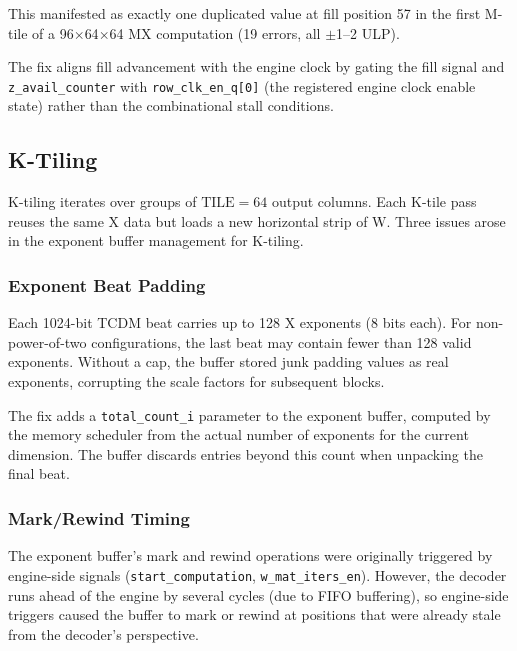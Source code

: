 This manifested as exactly one duplicated value at fill position 57 in the first
M-tile of a 96$\times$64$\times$64 MX computation (19 errors, all $\pm$1--2 ULP).

The fix aligns fill advancement with the engine clock by gating the fill signal
and \texttt{z\_avail\_counter} with \texttt{row\_clk\_en\_q[0]} (the registered
engine clock enable state) rather than the combinational stall conditions.



\subsection{K-Tiling}
\label{sec:k-tiling}

K-tiling iterates over groups of $\text{TILE} = 64$ output columns. Each K-tile
pass reuses the same X data but loads a new horizontal strip of W. Three issues
arose in the exponent buffer management for K-tiling.

\subsubsection{Exponent Beat Padding}

Each 1024-bit TCDM beat carries up to 128 X exponents (8 bits each). For
non-power-of-two configurations, the last beat may contain fewer than 128 valid
exponents. Without a cap, the buffer stored junk padding values as real
exponents, corrupting the scale factors for subsequent blocks.

The fix adds a \texttt{total\_count\_i} parameter to the exponent buffer,
computed by the memory scheduler from the actual number of exponents for the
current dimension. The buffer discards entries beyond this count when unpacking
the final beat.

\subsubsection{Mark/Rewind Timing}

The exponent buffer's mark and rewind operations were originally triggered by
engine-side signals (\texttt{start\_computation}, \texttt{w\_mat\_iters\_en}).
However, the decoder runs ahead of the engine by several cycles (due to FIFO
buffering), so engine-side triggers caused the buffer to mark or rewind at
positions that were already stale from the decoder's perspective.

